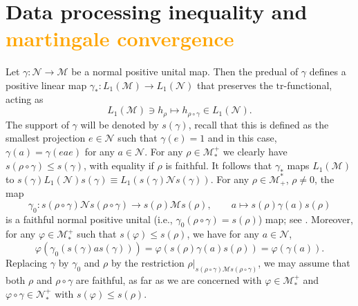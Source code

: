 \documentclass[12pt]{article}
\theoremstyle{definition}
\theoremstyle{remark}
\numberwithin{equation}{section}
\def\Me{\mathcal M}
\def\Ne{\mathcal N}
\def\Tr{\mathrm{tr}}
\def\ffi{\varphi}
\begin{document}
\section{Data processing inequality and \textcolor{orange}{martingale convergence}}

Let  $\gamma: \Ne\to \Me$ be a normal positive unital map. Then the  predual of $\gamma$  defines a 
positive linear map $\gamma_*: L_1(\Me)\to L_1(\Ne)$ that preserves the {$\Tr$-functional,}
acting as
\[
L_1(\Me)\ni h_\rho\mapsto h_{\rho\circ\gamma} \in L_1(\Ne).
\]
The support
of $\gamma$ will be denoted by $s(\gamma)$, recall that this is defined as the smallest projection
$e\in \Ne$ such that $\gamma(e)=1$ and in this case, $\gamma(a)=\gamma(eae)$ for any $a\in
\Ne$. For any $\rho\in \Me_*^+$ we clearly have
$s(\rho\circ\gamma)\le s(\gamma)$, with equality if $\rho$ is faithful. 
It follows that $\gamma_*$ maps $L_1(\Me)$ to $s(\gamma)L_1(\Ne)s(\gamma)\equiv
L_1(s(\gamma)\Ne s(\gamma))$.  For any $\rho\in \Me_+^*$, $\rho\ne 0$, the map
\[
\gamma_0: {s(\rho\circ\gamma)\Ne s(\rho\circ\gamma)}\to s(\rho)\Me s(\rho),
\qquad a\mapsto s(\rho) \gamma(a)s(\rho)
\]
is a faithful normal positive unital {(i.e., $\gamma_0(\rho\circ\gamma)=s(\rho)$)} map;
{see \cite[Remark 6.7]{hiai2021lectures}.} Moreover, for any $\ffi\in \Me_*^+$ such that
$s(\ffi)\le s(\rho)$, we have for any $a\in \Ne$,
\[
\ffi(\gamma_0(s(\gamma)as(\gamma)))=\ffi(s(\rho)\gamma(a)s(\rho))={\ffi(\gamma(a)).}
\]
Replacing $\gamma$ by $\gamma_0$ and $\rho$ by the restriction
{$\rho|_{s(\rho\circ\gamma)\Me s(\rho\circ\gamma)}$,} we may  assume that both $\rho$
and $\rho\circ\gamma$ are faithful, {as far as we are concerned with $\ffi\in\Me_*^+$ and
$\ffi\circ\gamma\in\Ne_*^+$ with $s(\ffi)\le s(\rho)$.}
\end{document}
